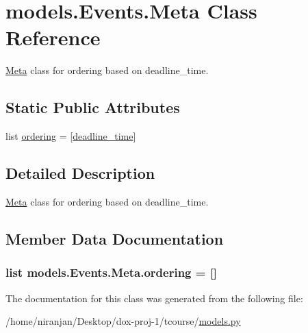 \hypertarget{classmodels_1_1_events_1_1_meta}{}\section{models.\+Events.\+Meta Class Reference}
\label{classmodels_1_1_events_1_1_meta}


\hyperlink{classmodels_1_1_events_1_1_meta}{Meta} class for ordering based on deadline\+\_\+time.  


\subsection*{Static Public Attributes}
\begin{DoxyCompactItemize}
\item 
list \hyperlink{classmodels_1_1_events_1_1_meta_a5974746cb0f4d16d9d29aec5b172542a}{ordering} = \mbox{[}\textquotesingle{}\hyperlink{classmodels_1_1_events_a9a31387cf1b90bea105100b320a8b6ee}{deadline\+\_\+time}\textquotesingle{}\mbox{]}
\end{DoxyCompactItemize}


\subsection{Detailed Description}
\hyperlink{classmodels_1_1_events_1_1_meta}{Meta} class for ordering based on deadline\+\_\+time. 

\subsection{Member Data Documentation}
\subsubsection[{\texorpdfstring{ordering}{ordering}}]{\setlength{\rightskip}{0pt plus 5cm}list models.\+Events.\+Meta.\+ordering = \mbox{[}\textquotesingle{}\mbox{]}\hspace{0.3cm}{\ttfamily [static]}}\hypertarget{classmodels_1_1_events_1_1_meta_a5974746cb0f4d16d9d29aec5b172542a}{}\label{classmodels_1_1_events_1_1_meta_a5974746cb0f4d16d9d29aec5b172542a}


The documentation for this class was generated from the following file\+:\begin{DoxyCompactItemize}
\item 
/home/niranjan/\+Desktop/dox-\/proj-\/1/tcourse/\hyperlink{models_8py}{models.\+py}\end{DoxyCompactItemize}

